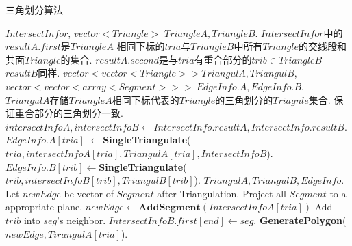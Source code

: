 \documentclass[a4paper]{book}
\renewcommand{\algorithmicrequire}{\textbf{输入:}}
\renewcommand{\algorithmicensure}{\textbf{输出:}}
\renewcommand{\algorithmicrequire}{\textbf{Input : }}
\renewcommand{\algorithmicrequire}{\textbf{Precondition : }}
\renewcommand{\algorithmicensure}{\textbf{Output : }}
\renewcommand{\algorithmicensure}{\textbf{Postcondition : }}
\numberwithin{equation}{chapter}
\theoremstyle{definition}
\begin{document}
\begin{algorithm}
	\caption{三角划分算法}
	\begin{algorithmic}[1]
		\renewcommand{\algorithmicrequire}{\textbf{Input : }}
		\Require $IntersectInfor$, $vector<Triangle>$ $TriangleA,TriangleB$.
		\renewcommand{\algorithmicrequire}{\textbf{Precondition : }}
		\Require $IntersectInfor$中的$resultA.first$是$TriangleA$
		相同下标的$tria$与$TriangleB$中所有$Triangle$的交线段和共面$Triangle$的集合.
		$resultA.second$是与$tria$有重合部分的$trib \in TriangleB$
		$resultB$同样.
		\renewcommand{\algorithmicensure}{\textbf{Output : }}
		\Ensure $vector<vector<Triangle>> TriangulA,TriangulB$,
		$vector<vector<array<Segment>>>\ EdgeInfo.A,EdgeInfo.B$.
		\renewcommand{\algorithmicensure}{\textbf{Postcondition : }}
		\Ensure $TriangulA$存储$TriangleA$相同下标代表的$Triangle$的三角划分的$Triagnle$集合.
		保证重合部分的三角划分一致.
		\State $intersectInfoA,intersectInfoB \gets IntersectInfo.resultA,IntersectInfo.resultB$.
		\State $EdgeInfo.A[tria]$
		\Statex \qquad \qquad \quad $\gets $\textbf{SingleTriangulate}($tria,intersectInfoA[tria],TriangulA[tria],IntersectInfoB$).
		\EndIf
		\EndFor
		\State $EdgeInfo.B[trib] \gets $\textbf{SingleTriangulate}($trib,intersectInfoB[trib],TriangulB[trib]$).
		\EndIf
		\EndFor
		\State \Return $TriangulA,TriangulB,EdgeInfo$.
		\EndFunction
		\State
		\State Let $newEdge$ be vector of $Segment$ after Triangulation.
		\State Project all $Segment$ to a appropriate plane.
		\State $newEdge \gets \textbf{AddSegment}(IntersectInfoA[tria])$
		\State Add $trib$ into $seg$'s neighbor.
		\State $IntersectInfoB.first[end] \gets seg$.  
		\EndIf
		\EndFor
		\EndFor
		\EndIf
		\State \Return \textbf{GeneratePolygon}($newEdge,TirangulA[tria]$).
		\EndFunction
	\end{algorithmic}
\end{algorithm}
\end{document}
